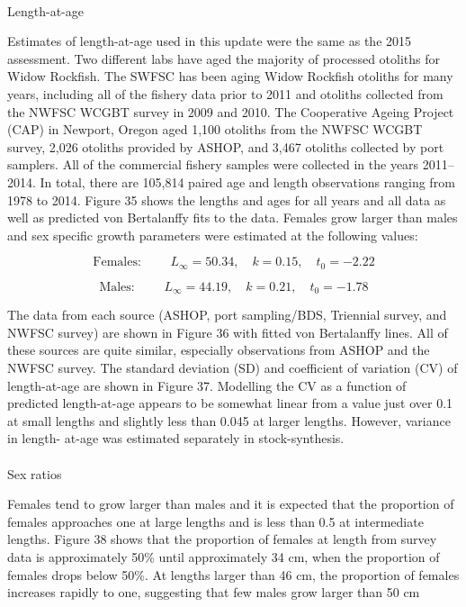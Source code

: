 \documentclass[
]{scrartcl}
\makeatletter
\let\oldparagraph\paragraph
\renewcommand{\paragraph}{
    \@ifstar
      \xxxParagraphStar
      \xxxParagraphNoStar
  }
\newcommand{\xxxParagraphStar}[1]{\oldparagraph*{#1}\mbox{}}
\newcommand{\xxxParagraphNoStar}[1]{\oldparagraph{#1}\mbox{}}
\makeatother
\begin{document}
\paragraph{Length-at-age}\label{length-at-age}

Estimates of length-at-age used in this update were the same as the 2015
assessment. Two different labs have aged the majority of processed
otoliths for Widow Rockfish. The SWFSC has been aging Widow Rockfish
otoliths for many years, including all of the fishery data prior to 2011
and otoliths collected from the NWFSC WCGBT survey in 2009 and 2010. The
Cooperative Ageing Project (CAP) in Newport, Oregon aged 1,100 otoliths
from the NWFSC WCGBT survey, 2,026 otoliths provided by ASHOP, and 3,467
otoliths collected by port samplers. All of the commercial fishery
samples were collected in the years 2011--2014. In total, there are
105,814 paired age and length observations ranging from 1978 to 2014.
Figure 35 shows the lengths and ages for all years and all data as well
as predicted von Bertalanffy fits to the data. Females grow larger than
males and sex specific growth parameters were estimated at the following
values:

\[
\text{Females: } \qquad  L_\infty = 50.34,\quad k=0.15, \quad t_0 = -2.22
\]

\[
\text{Males: } \qquad  L_\infty = 44.19,\quad k=0.21, \quad t_0 = -1.78
\]

The data from each source (ASHOP, port sampling/BDS, Triennial survey,
and NWFSC survey) are shown in Figure 36 with fitted von Bertalanffy
lines. All of these sources are quite similar, especially observations
from ASHOP and the NWFSC survey. The standard deviation (SD) and
coefficient of variation (CV) of length-at-age are shown in Figure 37.
Modelling the CV as a function of predicted length-at-age appears to be
somewhat linear from a value just over 0.1 at small lengths and slightly
less than 0.045 at larger lengths. However, variance in length- at-age
was estimated separately in stock-synthesis.

\paragraph{Sex ratios}\label{sex-ratios}

Females tend to grow larger than males and it is expected that the
proportion of females approaches one at large lengths and is less than
0.5 at intermediate lengths. Figure 38 shows that the proportion of
females at length from survey data is approximately 50\% until
approximately 34 cm, when the proportion of females drops below 50\%. At
lengths larger than 46 cm, the proportion of females increases rapidly
to one, suggesting that few males grow larger than 50 cm
\end{document}
